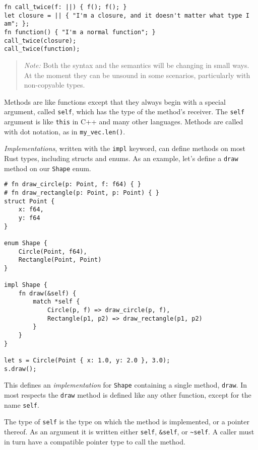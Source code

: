 \documentclass[]{article}
\begin{document}
\begin{verbatim}
fn call_twice(f: ||) { f(); f(); }
let closure = || { "I'm a closure, and it doesn't matter what type I am"; };
fn function() { "I'm a normal function"; }
call_twice(closure);
call_twice(function);
\end{verbatim}

\begin{quote}
\emph{Note:} Both the syntax and the semantics will be changing in small
ways. At the moment they can be unsound in some scenarios, particularly
with non-copyable types.
\end{quote}


Methods are like functions except that they always begin with a special
argument, called \texttt{self}, which has the type of the method's
receiver. The \texttt{self} argument is like \texttt{this} in C++ and
many other languages. Methods are called with dot notation, as in
\texttt{my\_vec.len()}.

\emph{Implementations}, written with the \texttt{impl} keyword, can
define methods on most Rust types, including structs and enums. As an
example, let's define a \texttt{draw} method on our \texttt{Shape} enum.

\begin{verbatim}
# fn draw_circle(p: Point, f: f64) { }
# fn draw_rectangle(p: Point, p: Point) { }
struct Point {
    x: f64,
    y: f64
}

enum Shape {
    Circle(Point, f64),
    Rectangle(Point, Point)
}

impl Shape {
    fn draw(&self) {
        match *self {
            Circle(p, f) => draw_circle(p, f),
            Rectangle(p1, p2) => draw_rectangle(p1, p2)
        }
    }
}

let s = Circle(Point { x: 1.0, y: 2.0 }, 3.0);
s.draw();
\end{verbatim}

This defines an \emph{implementation} for \texttt{Shape} containing a
single method, \texttt{draw}. In most respects the \texttt{draw} method
is defined like any other function, except for the name \texttt{self}.

The type of \texttt{self} is the type on which the method is
implemented, or a pointer thereof. As an argument it is written either
\texttt{self}, \texttt{\&self}, or \texttt{\textasciitilde{}self}. A
caller must in turn have a compatible pointer type to call the method.
\end{document}
